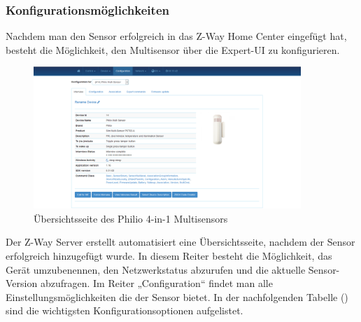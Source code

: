 \subsubsection{Konfigurationsmöglichkeiten}
Nachdem man den Sensor erfolgreich in das Z-Way Home Center eingefügt hat, besteht die Möglichkeit, den Multisensor über die Expert-UI zu konfigurieren.


\begin{figure}[h!]
	\centering
	\includegraphics[width=0.9\textwidth]{img/Sensorevaluation/PhilioConf1.png}
	\caption{Übersichtsseite des Philio 4-in-1 Multisensors}
	\label{fig:sensorenPhilioConf1}
\end{figure}

Der Z-Way Server erstellt automatisiert eine Übersichtsseite, nachdem der Sensor erfolgreich hinzugefügt wurde. In diesem Reiter besteht die Möglichkeit, das Gerät umzubenennen, den Netzwerkstatus abzurufen und die aktuelle Sensor-Version abzufragen. Im Reiter „Configuration“ findet man alle Einstellungsmöglichkeiten die der Sensor bietet. In der nachfolgenden Tabelle () sind die wichtigsten Konfigurationsoptionen aufgelistet.


